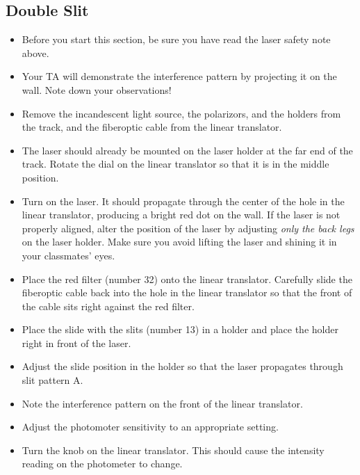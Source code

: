 \subsection{Double Slit}
\begin{itemize}
\item Before you start this section, be sure you have read the laser safety note above.

\item Your TA will demonstrate the interference pattern by projecting it on the wall. Note down your observations!

\item Remove the incandescent light source, the polarizors, and the holders from the track, and the fiberoptic cable from the linear translator.

\item The laser should already be mounted on the laser holder at the far end of the track. Rotate the dial on the linear translator so that it is in the middle position.

\item Turn on the laser. It should propagate through the center of the hole in the linear translator, producing a bright red dot on the wall. If the laser is not properly aligned, alter the position of the laser by adjusting \emph{only the back legs} on the laser holder. Make sure you avoid lifting the laser and shining it in your classmates' eyes.

\item Place the red filter (number 32) onto the linear translator. Carefully slide the fiberoptic cable back into the hole in the linear translator so that the front of the cable sits right against the red filter.

\item Place the slide with the slits (number 13) in a holder and place the holder right in front of the laser.

\item Adjust the slide position in the holder so that the laser propagates through slit pattern A.

\item Note the interference pattern on the front of the linear translator.

\item Adjust the photomoter sensitivity to an appropriate setting.

\item Turn the knob on the linear translator. This should cause the intensity reading on the photometer to change.


\end{itemize}
